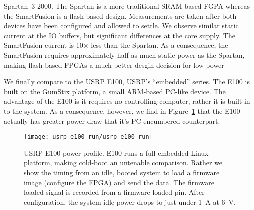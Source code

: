 Spartan~3-2000. The Spartan is a more traditional SRAM-based FGPA whereas the
SmartFusion is a flash-based design. Measurements are taken after both devices
have been configured and allowed to settle. We observe similar static current
at the IO buffers, but significant differences at the core supply. The
SmartFusion current is 10$\times$ less than the Spartan. As a consequence, the
SmartFusion requires approximately half as much static power as the Spartan,
making flash-based FPGAs a much better desgin decision for low-power

We finally compare \sdr to the USRP E100, USRP's ``embedded'' series. The E100
is built on the GumStix platform, a small ARM-based PC-like device. The
advantage of the E100 is it requires no controlling computer, rather it is
built in to the system. As a consequence, however, we find in
Figure~\ref{fig:usrp_e100} that the E100 actually has greater power draw that
it's PC-encumbered counterpart.


\begin{comment}
\begin{table}
	\centering
	\begin{tabular}{|c|c|c|} \hline
		\rowcolor[gray]{0}
		  {\sc {\color{white} AGC mode}}
		& {\sc {\color{white} Average ARR}}
		& {\sc {\color{white} Std}}
		\\ \hline
		SFD-latch 	& 97.27\% 	    & 0.211\%	\\ \hline
		Continuous	& 98.20\%	    & 0.065\%	\\ \hline
	\end{tabular}
    \caption{Acknowledgment reception rate (ARR) for two constructively
interfering transmitters with respect to different AGC modes. We transmitted
10,000 ACKs per transmitter per experiment and repeated each experiment 5
times. A continuous AGC performs slightly better due to the small carrier
frequency separation of the transmitting nodes.}
	\label{tab:ARR_versus_agc_mode}
\end{table}
\end{comment}


\begin{figure}[h]
	\centering
	\texttt{[image: usrp\_e100\_run/usrp\_e100\_run]}
	\caption{USRP E100 power profile. E100 runs a full embedded Linux
platform, making cold-boot an untenable comparison. Rather we show the timing
from an idle, booted system to load a firmware image (configure the FPGA) and
send the data.  The firmware loaded signal is recorded from a firmware loaded
pin. After configuration, the system idle power drops to
just under 1~A at 6~V.}
	\label{fig:usrp_e100}
\end{figure}

